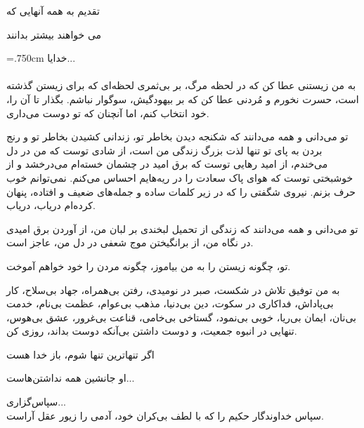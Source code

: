 
\begin{acknowledgementpage}
	
	\vspace{4cm}
	
	{\nastaliq
		{\LARGE
			تقدیم به همه آنهایی که 
			\vspace{1.5cm}
			
			\hspace{3cm}
			می خواهند بیشتر بدانند
	}}
\end{acknowledgementpage}
\newpage
\baselineskip=.750cm
\thispagestyle{empty}
{\nastaliq
	خدایا...%
}\\
\vspace{.5cm}\\

به من زیستنی عطا کن که در لحظه مرگ، بر بی‌ثمری لحظه‌ای که برای زیستن گذشته است، حسرت نخورم   و مُردنی عطا کن که بر بیهودگیش، سوگوار نباشم. بگذار تا آن را، خود انتخاب کنم، اما آنچنان که تو دوست می‌داری.

تو می‌دانی و همه می‌دانند که شکنجه دیدن بخاطر تو، زندانی کشیدن بخاطر تو و رنج بردن به پای تو تنها لذت بزرگ زندگی من است، از شادی توست که من در دل می‌خندم، از امید رهایی توست که برق امید در چشمان خسته‌ام می‌درخشد و از خوشبختی توست که هوای پاک سعادت را در ریه‌هایم احساس می‌کنم. نمی‌توانم خوب حرف بزنم. نیروی شگفتی را که در زیر کلمات ساده و جمله‌های ضعیف و افتاده، پنهان کرده‌ام دریاب، دریاب.

تو می‌دانی و همه می‌دانند که زندگی از تحمیل لبخندی بر لبان من، از آوردن برق امیدی در نگاه من، از برانگیختن موج شعفی در دل من، عاجز است.

تو، چگونه زیستن را به من بیاموز، چگونه مردن را خود خواهم آموخت.

به من توفیق تلاش در شکست، صبر در نومیدی، رفتن بی‌همراه، جهاد بی‌سلاح، کار بی‌پاداش، فداکاری در سکوت، دین بی‌دنیا، مذهب بی‌عوام، عظمت بی‌نام، خدمت بی‌نان، ایمان بی‌ریا، خوبی بی‌نمود، گستاخی بی‌خامی، قناعت بی‌غرور، عشق بی‌هوس، تنهایی در انبوه جمعیت، و دوست داشتن بی‌آنکه دوست بداند،  روزی کن. 

\vspace{1.5cm}
{\nastaliq
	\hspace{1cm}
	اگر تنها‌ترین تنها شوم، باز خدا هست
	\vspace{.8cm}
	
	\hspace{4.7cm}
	او جانشین همه نداشتن‌هاست...
}
\newpage\thispagestyle{empty}
{\nastaliq
	سپاس‌گزاری...
}
\\[2cm]
سپاس خداوندگار حکیم را که با لطف بی‌کران خود، آدمی را زیور عقل آراست.


